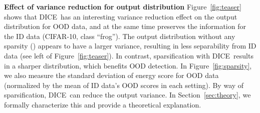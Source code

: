 \documentclass[runningheads]{llncs}
\newcommand{\methodAbbr}{DICE~}
\begin{document}
\noindent \textbf{Effect of variance reduction for output distribution} 
Figure~\ref{fig:teaser} shows that \methodAbbr has an interesting variance reduction effect on the output distribution for OOD data, and at the same time preserves the information for the ID data (CIFAR-10, class ``frog''). The output distribution without any sparsity () appears to have a larger variance, resulting in less separability from ID data (see left of Figure~\ref{fig:teaser}). In contrast, sparsification with \methodAbbr results in a sharper distribution, which benefits OOD detection. 
In Figure~\ref{fig:sparsity}, we also measure the standard deviation of energy score for OOD data (normalized by the mean of ID data's OOD scores in each setting). By way of sparsification, \methodAbbr can reduce the output variance. In Section~\ref{sec:theory}, we formally characterize this and provide a theoretical explanation. 




\begin{table}[t]
\caption{\small \textbf{Ablation results.} Effect of different \textit{post hoc} sparsification methods for OOD detection with ImageNet as ID dataset. All sparsification methods are based on the {same OOD scoring function}~\cite{liu2020energy}, with sparsity parameter . All values are percentages and are averaged over multiple OOD test datasets.}
\label{tab:prune-results}
\centering
{}
\end{table}
\end{document}
